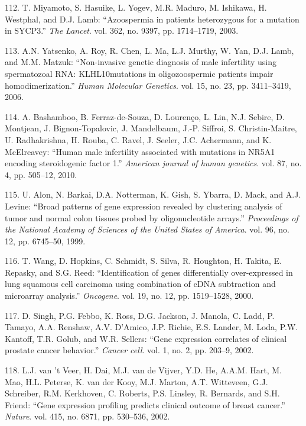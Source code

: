 \documentclass[12pt,a4paper,twoside]{ugathesis}
\theoremstyle{definition}
\theoremstyle{definition}
\theoremstyle{definition}
\theoremstyle{remark}
\begin{document}
\hypertarget{ref-Miyamoto2003}{}
112. T. Miyamoto, S. Hasuike, L. Yogev, M.R. Maduro, M. Ishikawa, H.
Westphal, and D.J. Lamb: ``Azoospermia in patients heterozygous for a
mutation in SYCP3.'' \emph{The Lancet}. vol. 362, no. 9397, pp.
1714--1719, 2003.

\hypertarget{ref-Yatsenko2006}{}
113. A.N. Yatsenko, A. Roy, R. Chen, L. Ma, L.J. Murthy, W. Yan, D.J.
Lamb, and M.M. Matzuk: ``Non-invasive genetic diagnosis of male
infertility using spermatozoal RNA: KLHL10mutations in oligozoospermic
patients impair homodimerization.'' \emph{Human Molecular Genetics}.
vol. 15, no. 23, pp. 3411--3419, 2006.

\hypertarget{ref-Bashamboo2010}{}
114. A. Bashamboo, B. Ferraz-de-Souza, D. Lourenço, L. Lin, N.J. Sebire,
D. Montjean, J. Bignon-Topalovic, J. Mandelbaum, J.-P. Siffroi, S.
Christin-Maitre, U. Radhakrishna, H. Rouba, C. Ravel, J. Seeler, J.C.
Achermann, and K. McElreavey: ``Human male infertility associated with
mutations in NR5A1 encoding steroidogenic factor 1.'' \emph{American
journal of human genetics}. vol. 87, no. 4, pp. 505--12, 2010.

\hypertarget{ref-Alon1999}{}
115. U. Alon, N. Barkai, D.A. Notterman, K. Gish, S. Ybarra, D. Mack,
and A.J. Levine: ``Broad patterns of gene expression revealed by
clustering analysis of tumor and normal colon tissues probed by
oligonucleotide arrays.'' \emph{Proceedings of the National Academy of
Sciences of the United States of America}. vol. 96, no. 12, pp.
6745--50, 1999.

\hypertarget{ref-Wang2000}{}
116. T. Wang, D. Hopkins, C. Schmidt, S. Silva, R. Houghton, H. Takita,
E. Repasky, and S.G. Reed: ``Identification of genes differentially
over-expressed in lung squamous cell carcinoma using combination of cDNA
subtraction and microarray analysis.'' \emph{Oncogene}. vol. 19, no. 12,
pp. 1519--1528, 2000.

\hypertarget{ref-Singh2002}{}
117. D. Singh, P.G. Febbo, K. Ross, D.G. Jackson, J. Manola, C. Ladd, P.
Tamayo, A.A. Renshaw, A.V. D'Amico, J.P. Richie, E.S. Lander, M. Loda,
P.W. Kantoff, T.R. Golub, and W.R. Sellers: ``Gene expression correlates
of clinical prostate cancer behavior.'' \emph{Cancer cell}. vol. 1, no.
2, pp. 203--9, 2002.

\hypertarget{ref-VantVeer2002}{}
118. L.J. van 't Veer, H. Dai, M.J. van de Vijver, Y.D. He, A.A.M. Hart,
M. Mao, H.L. Peterse, K. van der Kooy, M.J. Marton, A.T. Witteveen, G.J.
Schreiber, R.M. Kerkhoven, C. Roberts, P.S. Linsley, R. Bernards, and
S.H. Friend: ``Gene expression profiling predicts clinical outcome of
breast cancer.'' \emph{Nature}. vol. 415, no. 6871, pp. 530--536, 2002.
\end{document}
